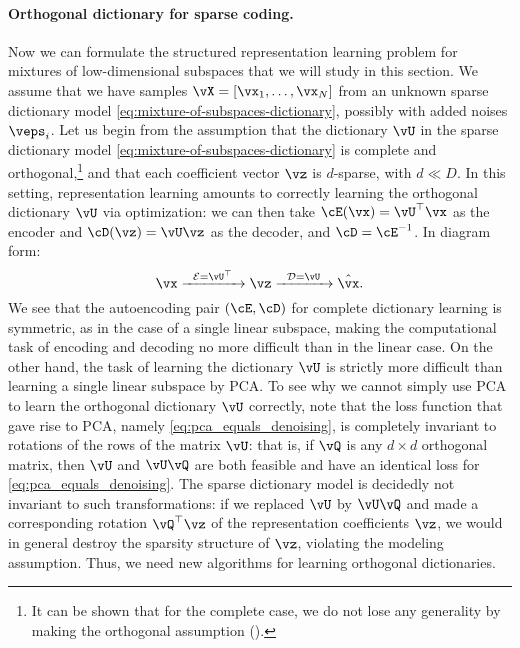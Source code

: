 \documentclass[../../book-main.tex]{subfiles}
\begin{document}
\paragraph{Orthogonal dictionary for sparse coding.}
Now we can formulate the structured representation learning problem for mixtures of low-dimensional subspaces that we will study in this section.
We assume that we have samples $\vX = [\vx_1, \dots, \vx_N]$ from an unknown sparse dictionary model \eqref{eq:mixture-of-subspaces-dictionary}, possibly with added noises $\veps_i$.
Let us begin from the assumption that the dictionary $\vU$ in the sparse
dictionary model \eqref{eq:mixture-of-subspaces-dictionary} is complete and
orthogonal,\footnote{It can be shown that for the complete case, we do not lose any generality by making the orthogonal assumption ().} and that each coefficient vector $\vz$ is $d$-sparse, with $d \ll D$.
In this setting, representation learning amounts to correctly learning the orthogonal dictionary $\vU$ via optimization: we
can then take $\cE(\vx) = \vU^\top \vx$ as the encoder and $\cD(\vz) = \vU \vz$
as the decoder, and $\cD = \cE^{-1}$. In diagram form:
\begin{equation}
\vx \xrightarrow{\hspace{2mm} \mathcal{E} = \vU^\top \hspace{2mm}}  \vz \xrightarrow{\hspace{2mm} \mathcal{D} = \vU \hspace{2mm}}   \hat{\vx}.  
\label{eqn:autoencoding-DL}
\end{equation}    
We see that the autoencoding pair $(\cE, \cD)$ for complete dictionary learning is symmetric, as in the case of a single linear subspace, making the computational task of encoding and decoding no more difficult than in the linear case. On the other hand, the task of learning the dictionary $\vU$ is strictly more difficult than learning a single linear subspace by PCA. 
To see why we cannot simply use PCA to learn the orthogonal dictionary $\vU$ correctly, note that the 
loss function that gave rise to PCA, namely \eqref{eq:pca_equals_denoising}, is
completely invariant to rotations of the rows of the matrix $\vU$: that is, if
$\vQ$ is any $d \times d$ orthogonal matrix, then $\vU$ and $\vU \vQ$ are both
feasible and have an identical loss for \eqref{eq:pca_equals_denoising}. The
sparse dictionary model is decidedly not invariant to such transformations: if
we replaced $\vU$ by $\vU \vQ$ and made a corresponding rotation $\vQ^\top \vz$
of the representation coefficients $\vz$, we would in general destroy the sparsity structure of $\vz$, violating the modeling assumption. Thus, we need new algorithms for learning orthogonal dictionaries. 
\end{document}

